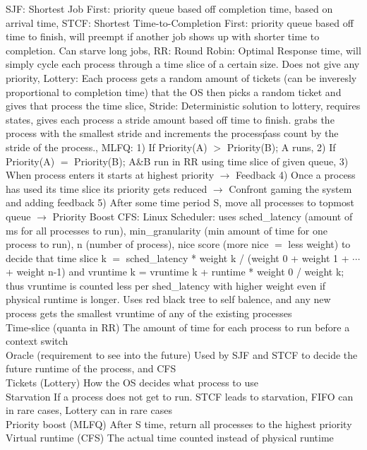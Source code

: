 \documentclass[6pt]{article}
\begin{document}
SJF:
Shortest Job First: priority queue based off completion time, based on arrival time,
STCF:
Shortest Time-to-Completion First: priority queue based off time to finish, will preempt if another job shows up with shorter time to completion. Can starve long jobs,
RR:
Round Robin: Optimal Response time, will simply cycle each process through a time slice of a certain size. Does not give any priority,
Lottery:
Each process gets a random amount of tickets (can be inveresly proportional to completion time) that the OS then picks a random ticket and gives that process the time slice,
Stride:
Deterministic solution to lottery, requires states, gives each process a stride amount based off time to finish. grabs the process with the smallest stride and increments the process\' pass count by the stride of the process.,
MLFQ:
1) If Priority(A) $>$ Priority(B); A runs,
2) If Priority(A) $=$ Priority(B); A\&B run in RR using time slice of given queue,
3) When process enters it starts at highest priority $\rightarrow$ Feedback
4) Once a process has used its time slice its priority gets reduced $\rightarrow$ Confront gaming the system and adding feedback
5) After some time period S, move all processes to topmost queue $\rightarrow$ Priority Boost
CFS:
Linux Scheduler: uses sched\_latency (amount of ms for all processes to run), min\_granularity (min amount of time for one process to run), n (number of process),
nice score (more nice $=$ less weight) to decide that time slice k $=$ sched\_latency * weight k / (weight 0 + weight 1 + $\cdots$ + weight n-1) and
vruntime k = vruntime k + runtime * weight 0 / weight k; thus vruntime is counted less per shed\_latency with higher weight even if physical runtime is longer. Uses red black tree to self balence, and any new process gets the smallest vruntime of any of the existing processes
\\
Time-slice (quanta in RR)
The amount of time for each process to run before a context switch
\\
Oracle (requirement to see into the future)
Used by SJF and STCF to decide the future runtime of the process, and CFS
\\
Tickets (Lottery)
How the OS decides what process to use
\\
Starvation
If a process does not get to run. STCF leads to starvation, FIFO can in rare cases, Lottery can in rare cases
\\
Priority boost (MLFQ)
After S time, return all processes to the highest priority
\\
Virtual runtime (CFS)
The actual time counted instead of physical runtime
\end{document}
